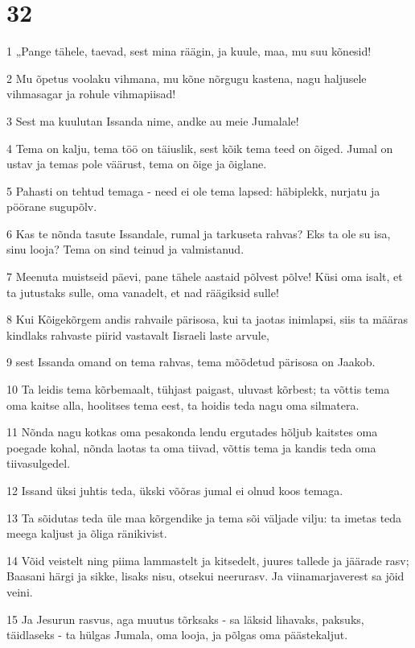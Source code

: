 \chapter{32}

\par 1 „Pange tähele, taevad, sest mina räägin, ja kuule, maa, mu suu kõnesid!
\par 2 Mu õpetus voolaku vihmana, mu kõne nõrgugu kastena, nagu haljusele vihmasagar ja rohule vihmapiisad!
\par 3 Sest ma kuulutan Issanda nime, andke au meie Jumalale!
\par 4 Tema on kalju, tema töö on täiuslik, sest kõik tema teed on õiged. Jumal on ustav ja temas pole väärust, tema on õige ja õiglane.
\par 5 Pahasti on tehtud temaga - need ei ole tema lapsed: häbiplekk, nurjatu ja pöörane sugupõlv.
\par 6 Kas te nõnda tasute Issandale, rumal ja tarkuseta rahvas? Eks ta ole su isa, sinu looja? Tema on sind teinud ja valmistanud.
\par 7 Meenuta muistseid päevi, pane tähele aastaid põlvest põlve! Küsi oma isalt, et ta jutustaks sulle, oma vanadelt, et nad räägiksid sulle!
\par 8 Kui Kõigekõrgem andis rahvaile pärisosa, kui ta jaotas inimlapsi, siis ta määras kindlaks rahvaste piirid vastavalt Iisraeli laste arvule,
\par 9 sest Issanda omand on tema rahvas, tema mõõdetud pärisosa on Jaakob.
\par 10 Ta leidis tema kõrbemaalt, tühjast paigast, uluvast kõrbest; ta võttis tema oma kaitse alla, hoolitses tema eest, ta hoidis teda nagu oma silmatera.
\par 11 Nõnda nagu kotkas oma pesakonda lendu ergutades hõljub kaitstes oma poegade kohal, nõnda laotas ta oma tiivad, võttis tema ja kandis teda oma tiivasulgedel.
\par 12 Issand üksi juhtis teda, ükski võõras jumal ei olnud koos temaga.
\par 13 Ta sõidutas teda üle maa kõrgendike ja tema sõi väljade vilju: ta imetas teda meega kaljust ja õliga ränikivist.
\par 14 Võid veistelt ning piima lammastelt ja kitsedelt, juures tallede ja jäärade rasv; Baasani härgi ja sikke, lisaks nisu, otsekui neerurasv. Ja viinamarjaverest sa jõid veini.
\par 15 Ja Jesurun rasvus, aga muutus tõrksaks - sa läksid lihavaks, paksuks, täidlaseks - ta hülgas Jumala, oma looja, ja põlgas oma päästekaljut.
